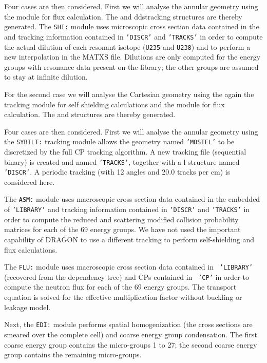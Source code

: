 Four cases are then considered. First we will analyse the annular geometry using the  module for flux
calculation. The  and dds{tracking} structures are thereby
generated. The {\tt SHI:} module uses microscopic cross section data contained in the
 and tracking information contained in {\tt 'DISCR'} and {\tt 'TRACKS'} in order to
compute the actual dilution of each resonant isotope ({\tt U235} and {\tt U238}) and to perform a
new interpolation in the MATXS file. Dilutions are only computed for the energy groups with resonance data present on the library; the other groups are assumed to stay at infinite dilution.

For the second case we will analyse the Cartesian geometry using the again the
 tracking module for self shielding calculations and the  module for
flux calculation. The  and  structures are thereby generated.

Four cases are then considered. First we will analyse the annular geometry using the {\tt SYBILT:}
tracking module allows the geometry named {\tt 'MOSTEL'} to be discretized by the full CP tracking
algorithm. A new tracking file (sequential binary) is created and named {\tt 'TRACKS'}, together
with a
l structure named {\tt 'DISCR'}. A periodic tracking (with 12
angles and 20.0 tracks per cm) is considered here.

The {\tt ASM:} module uses macroscopic cross section data contained in the
embedded  of {\tt 'LIBRARY'} and tracking information contained
in {\tt 'DISCR'} and {\tt 'TRACKS'} in order to compute the reduced and
scattering modified collision probability matrices for each of the 69 energy
groups. We have not used the important capability of DRAGON to use a different
tracking to perform self-shielding and flux calculations.


The {\tt FLU:} module uses macroscopic cross section data contained in {\tt
'LIBRARY'} (recovered from the dependency tree) and CPs contained in {\tt
'CP'} in order to compute the neutron flux for each of the 69 energy groups. The
transport equation is solved for the effective multiplication factor
without buckling or leakage model.


Next, the {\tt EDI:} module performs spatial homogenization (the cross sections
are smeared over the complete cell) and coarse energy group condensation. The
first coarse energy group contains the micro-groups 1 to 27; the second coarse
energy group contains the remaining micro-groups. 

\eject
